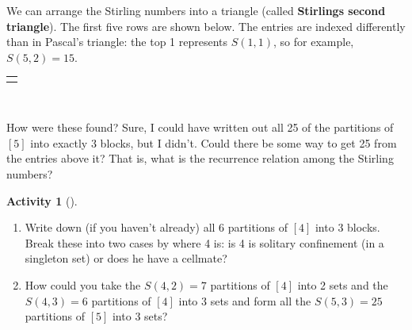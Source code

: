 \documentclass[10pt,]{book}
\newcommand{\terminology}[1]{\textbf{#1}}
\theoremstyle{plain}
\theoremstyle{definition}
\theoremstyle{definition}
\theoremstyle{definition}
\newtheorem{activity}[project]{Activity}
\numberwithin{equation}{chapter}
\newlength{\panelmax}
\begin{document}
\hypertarget{p-1084}{}%
We can arrange the Stirling numbers into a triangle (called \terminology{Stirlings second triangle}).  The first five rows are shown below.  The entries are indexed differently than in Pascal's triangle: the top 1 represents \(S(1,1)\), so for example, \(S(5,2) = 15\).%
{%
\setlength{\panelmax}{0pt}
\ifdefined\panelboxAtabular\else\newsavebox{\panelboxAtabular}\fi%
\ifdefined\phAtabular\else\newlength{\phAtabular}\fi%
\setlength{\phAtabular}{\ht\panelboxAtabular+\dp\panelboxAtabular}
\settototalheight{\phAtabular}{\usebox{\panelboxAtabular}}
\setlength{\panelmax}{\maxof{\panelmax}{\phAtabular}}
\leavevmode%
\setlength{\tabcolsep}{0\linewidth}
\par\medskip\noindent
\hspace*{0.25\linewidth}%
\begin{tabular}{@{}*{1}{c}@{}}
\begin{minipage}[c][\panelmax][t]{0.5\linewidth}\usebox{\panelboxAtabular}\end{minipage}\end{tabular}\\
}%
\par
\hypertarget{p-1085}{}%
How were these found?  Sure, I could have written out all 25 of the partitions of \([5]\) into exactly \(3\) blocks, but I didn't.  Could there be some way to get 25 from the entries above it?  That is, what is the recurrence relation among the Stirling numbers?%
\begin{activity}[]\label{activity-192}
\leavevmode%
\begin{enumerate}[font=\bfseries,label=(\alph*),ref=\alph*]
\item\label{task-211} \hypertarget{p-1086}{}%
Write down (if you haven't already) all 6 partitions of \([4]\) into \(3\) blocks.  Break these into two cases by where 4 is: is 4 is solitary confinement (in a singleton set) or does he have a cellmate?%
\item\label{task-212} \hypertarget{p-1087}{}%
How could you take the \(S(4,2) = 7\) partitions of \([4]\) into 2 sets and the \(S(4,3) = 6\) partitions of \([4]\) into 3 sets and form all the \(S(5,3) = 25\) partitions of \([5]\) into \(3\) sets?%
\end{enumerate}
\end{activity}
\end{document}
